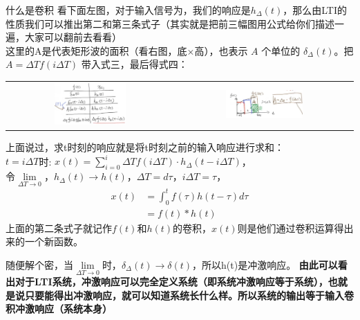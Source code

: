 \documentclass[UTF8,a4paper,12pt]{ctexart}
\begin{document}
\begin{flushleft}
\begin{titlebox}{什么是卷积}
      看下面左图，对于输入信号为，我们的响应是$h _{\varDelta}(t)$，那么由LTI的性质我们可以推出第二和第三条式子（其实就是把前三幅图用公式给你们描述一遍，大家可以翻前去看看）\\
      这里的A是代表矩形波的面积（看右图，底×高），也表示 \( A \) 个单位的 \(\delta_{\varDelta}(t)\)。把 \( A = \varDelta T f(i\varDelta T) \) 带入式三，最后得式四：
        \begin{tabular}{cc}
            \includegraphics[width=0.45\textwidth]{picture/juanji_8.png} &
            \includegraphics[width=0.45\textwidth]{picture/juanji_7.png} \\
        \end{tabular}
        \begin{flushleft}
          \vspace{1cm}
          上面说过，求t时刻的响应就是将t时刻之前的输入响应进行求和：
          \\$t=i\varDelta T$时: $x\left( t \right) =\sum_{i=0}^i{\varDelta Tf\left( i\varDelta T \right) \cdot}h_{\varDelta}\left( t-i\varDelta T \right) $，\\
          令$\underset{\varDelta T\rightarrow 0}{\lim}$，$h_{\varDelta}\left( t \right) \rightarrow h\left( t \right)$，$\varDelta T=d\tau$，$i\varDelta T=\tau$，
          \begin{align*}
            x(t) &=\int_0^t{f\left( \tau \right)}h\left( t-\tau \right) d\tau  \\
                 &= f(t)*h(t)
          \end{align*}
          上面的第二条式子就记作$f(t)$和$h(t)$的卷积，$x(t)$则是他们通过卷积运算得出来的一个新函数。
        \end{flushleft}
    
     
    \end{titlebox}
    随便解个密，当$\underset{\varDelta T\rightarrow 0}{\lim}$时，\(\delta_{\varDelta}(t)\rightarrow \delta(t)\)，所以h(t)是冲激响应。\textbf{ 由此可以看出对于LTI系统，冲激响应可以完全定义系统（即系统冲激响应等于系统），也就是说只要能得出冲激响应，就可以知道系统长什么样。所以系统的输出等于输入卷积冲激响应（系统本身）}
  \end{flushleft}
\end{document}
